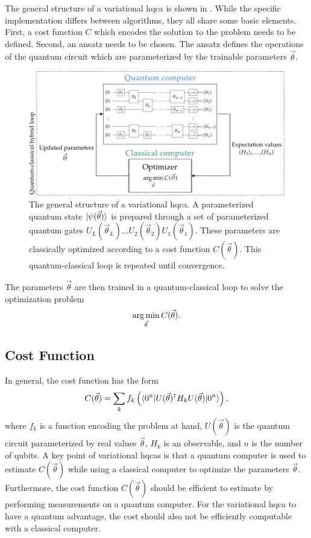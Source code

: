 The general structure of a variational \gls{hqca} is shown in .
While the specific implementation differs between algorithms, they all share some basic elements.
First, a cost function $C$ which encodes the solution to the problem needs to be defined.
Second, an ansatz needs to be chosen.
The ansatz defines the operations of the quantum circuit which are parameterized by the trainable parameters $\vec{\theta}$.
\begin{figure}[ht]
    \centering
    \includegraphics[width=1\linewidth]{figures/vqa-general-structure.pdf}
    \caption[The general structure of a variational \acrshort{hqca}.]{The general structure of a variational \gls{hqca}. A parameterized quantum state $\vert{\psi(\vec{\theta})}\rangle$ is prepared through a set of parameterized quantum gates $U_L(\vec{\theta}_L) \ldots U_2(\vec{\theta}_2)U_1(\vec{\theta}_1)$. These parameters are classically optimized according to a cost function $C(\vec{\theta})$. This quantum-classical loop is repeated until convergence.}
    \label{fig:vqa-general-structure}
\end{figure}
The parameters $\vec{\theta}$ are then trained in a quantum-classical loop to solve the optimization problem
\begin{equation} \label{eqn:optimization-problem}
\operatorname*{arg\,min}_{\vec{\theta}} C(\vec{\theta}).
\end{equation}

\subsection{Cost Function}
In general, the cost function has the form
\begin{equation} \label{eqn:general-cost-function}
C(\vec{\theta}) = \sum_k f_k\left(\langle{0^n}\vert U(\vec{\theta})^\dagger H_k U(\vec{\theta})\vert{0^n}\rangle\right),
\end{equation}
where $f_k$ is a function encoding the problem at hand, $U(\vec{\theta})$ is the quantum circuit parameterized by real values $\vec{\theta}$, $H_k$ is an observable, and $n$ is the number of qubits.
A key point of variational \glspl{hqca} is that a quantum computer is used to estimate $C(\vec{\theta})$ while using a classical computer to optimize the parameters $\vec{\theta}$.
Furthermore, the cost function $C(\vec{\theta})$ should be efficient to estimate by performing measurements on a quantum computer.
For the variational \gls{hqca} to have a quantum advantage, the cost should also not be efficiently computable with a classical computer.

